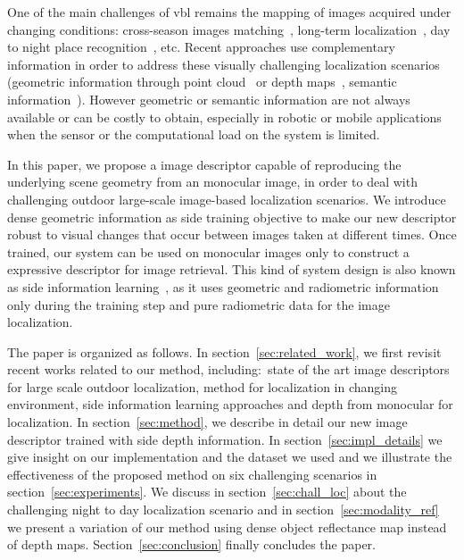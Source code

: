 One of the main challenges of \ac{vbl} remains the mapping of images acquired under changing conditions: cross-season images matching~\cite{Naseer2017a}, long-term localization~\cite{Toft2018}, day to night place recognition~\cite{Torii2015}, etc. Recent approaches use complementary information in order to address these visually challenging localization scenarios (geometric information through point cloud~\cite{Sattler2018,Schonberger2018} or depth maps~\cite{Christie2016}, semantic information~\cite{Ardeshir2014,Christie2016,Naseer2017a}). However geometric or semantic information are not always available or can be costly to obtain, especially in robotic or mobile applications when the sensor or the computational load on the system is limited.

In this paper, we propose a image descriptor capable of reproducing the underlying scene geometry from an monocular image, in order to deal with challenging outdoor large-scale image-based localization scenarios. We introduce dense geometric information as side training objective to make our new descriptor robust to visual changes that occur between images taken at different times. Once trained, our system can be used on monocular images only to construct a expressive descriptor for image retrieval. This kind of system design is also known as side information learning~\cite{Hoffman2016}, as it uses geometric and radiometric information only during the training step and pure radiometric data for the image localization. 

The paper is organized as follows. In section~\ref{sec:related_work}, we first revisit recent works related to our method, including:~state of the art image descriptors for large scale outdoor localization, method for localization in changing environment, side information learning approaches and depth from monocular for localization. In section~\ref{sec:method}, we describe in detail our new image descriptor trained with side depth information. In section~\ref{sec:impl_details} we give insight on our implementation and the dataset we used and we illustrate the effectiveness of the proposed method on six challenging scenarios in section~\ref{sec:experiments}. We discuss in section~\ref{sec:chall_loc} about the challenging night to day localization scenario and in section~\ref{sec:modality_ref} we present a variation of our method using dense object reflectance map instead of depth maps. Section~\ref{sec:conclusion} finally concludes the paper.

